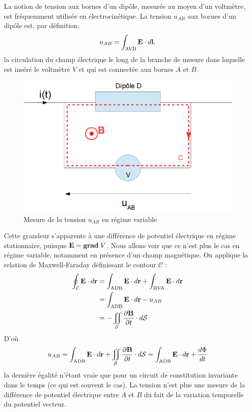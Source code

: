 \documentclass[11pt,a4paper]{report}
\begin{document}
La notion de tension aux bornes d'un dipôle, mesurée au moyen d'un voltmètre, est fréquemment utilisée en électrocinétique. La tension $u_{AB}$ aux bornes d'un dipôle est, par définition,
\begin{equation}
	u_{AB} = \int_{\text{AVB}} \bold{E}\cdot d\bold{l},
\end{equation}
la circulation du champ électrique le long de la branche de mesure dans laquelle est inséré le voltmètre $V$ et qui est connectée aux bornes $A$ et $B$. 
\begin{figure}[h!]
	\begin{center}
		\includegraphics[scale = 0.4]{tension_variable.png}
		\caption{Mesure de la tension $u_{AB}$ en régime variable} 
		\label{fig:tension_variable}
	\end{center}
\end{figure}
Cette grandeur s'apparente à une différence de potentiel électrique en régime stationnaire, puisque $\bold{E} = \textbf{grad}\;V$. Nous allons voir que ce n'est plus le cas en régime variable, notamment en présence d'un champ magnétique. On applique la relation de Maxwell-Faraday définissant le contour $\mathcal{C}$ :
\begin{align}
	\oint_\mathcal{C}\bold{E}\cdot d\bold{r} & = \int_{\text{ADB}}\bold{E}\cdot d\bold{r} + \int_{\text{BVA}}\bold{E}\cdot d\bold{r}\\
	& = \int_{\text{ADB}}\bold{E}\cdot d\bold{r} - u_{AB}\\
	& = - \iint_\mathcal{S}\frac{\partial\bold{B}}{\partial t}\cdot d\mathcal{S}
\end{align}
D'où
\begin{equation}
	u_{AB} = \int_{\text{ADB}}\bold{E}\cdot d\bold{r} + \iint_\mathcal{S}\frac{\partial\bold{B}}{\partial t}\cdot d\mathcal{S} 
		   = \int_{\text{ADB}}\bold{E}\cdot d\bold{r} + \frac{d\Phi}{dt}
\end{equation}
la dernière égalité n'étant vraie que pour un circuit de constitution invariante dans le temps (ce qui est souvent le cas). La tension n'est plus une mesure de la différence de potentiel électrique entre $A$ et $B$ du fait de la variation temporelle du potentiel vecteur.\\
\end{document}
